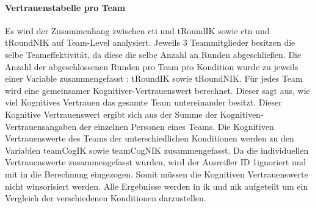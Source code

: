 \documentclass[a4paper,11pt]{article}%
\renewcommand{\\}{\vspace*{0.5\baselineskip} \newline}
\begin{document}
\paragraph{Vertrauenstabelle pro Team}
Es wird der Zusammenhang zwischen \ac{cti} und \ac{tRoundIK} sowie \ac{ctn} und \ac{tRoundNIK} auf Team-Level analysiert.
Jeweils 3 Teammitglieder besitzen die selbe Teameffektivität, da diese die selbe Anzahl an Runden abgeschließen. Die Anzahl der abgeschlossenen Runden pro Team pro Kondition wurde zu jeweils einer Variable zusammengefasst : \ac{tRoundIK} sowie \ac{tRoundNIK}. Für jedes Team wird eine gemeinsamer Kognitiver-Vertrauenswert berechnet. Dieser sagt aus, wie viel Kognitives Vertrauen das gesamte Team untereinander besitzt. Dieser Kognitive Vertrauenswert ergibt sich aus der Summe der Kognitiven-Vertrauensangaben der einzelnen Personen eines Teams. Die Kognitiven Vertrauenswerte des Teams der unterschiedlichen Konditionen werden zu den Variablen \ac{teamCogIK} sowie \ac{teamCogNIK} zusammengefasst.
Da die individuellen Vertrauenswerte zusammengefasst wurden, wird der Ausreißer \flqq ID 1\frqq ignoriert und mit in die Berechnung eingezogen. Somit müssen die Kognitiven Vertrauenswerte nicht winsorisiert werden. Alle Ergebnisse werden in \ac{ik} und \ac{nik} aufgeteilt um ein Vergleich der verschiedenen Konditionen darzustellen.
\end{document}
